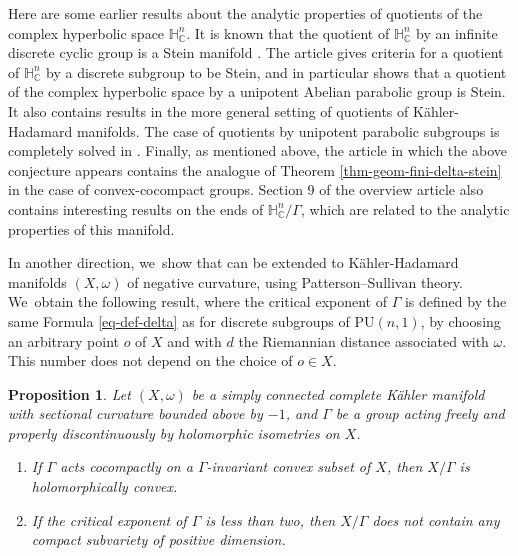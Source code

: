 \documentclass[11pt]{article}
\newtheorem{propositionIntro}[theoremIntro]{Proposition}
\theoremstyle{definition}
\newcommand{\C}{\mathbb{C}}
\newcommand{\HNC}{\mathbb{H}^{n}_{\C}}
\newcommand{\PU}{\mathrm{PU}}
\def\C{\mathbb{C}}
\newcommand{\HNC}{\mathbb{H}^{n}_{\C}}
\newcommand{\PU}{\mathrm{PU}}
\begin{document}
Here are some earlier results about the analytic properties of quotients of the complex hyperbolic space $\HNC$. It is known that the quotient of $\HNC$ by an infinite discrete cyclic group is a Stein manifold \cite{defabritiisFamilyComplexManifolds1998manuel,defabritiisQuotientsUnitBall2001manuel,miebachQuotientsBoundedHomogeneous2010}. The article \cite{chenDiscreteGroupsHolomorphic2013} gives criteria for a quotient of $\HNC$ by a discrete subgroup to be Stein, and in particular shows that a quotient of the complex hyperbolic space by a unipotent Abelian parabolic group is Stein. It also contains results in the more general setting of quotients of Kähler-Hadamard manifolds. The case of quotients by unipotent parabolic subgroups is completely solved in \cite{miebachQuotientsBoundedHomogeneous2024}. Finally, as mentioned above, the article \cite{deyNoteComplexhyperbolicKleinian2020} in which the above conjecture appears contains the analogue of Theorem \ref{thm-geom-fini-delta-stein} in the case of convex-cocompact groups. Section 9 of the overview article \cite{kapovichSurveyComplexHyperbolic2022} also contains interesting results on the ends of $\HNC/\Gamma$, which are related to the analytic properties of this manifold.

In another direction, we~show that \cite[Th.\,1]{deyNoteComplexhyperbolicKleinian2020} can be extended to Kähler-Hadamard manifolds $(X,\omega)$ of negative curvature, using Patterson--Sullivan theory. We~obtain the following result, where the critical exponent of $\Gamma$ is defined by the same Formula \eqref{eq-def-delta} as for discrete subgroups of $\PU(n,1)$, by choosing an arbitrary point $o$ of $X$ and with $d$ the Riemannian distance associated with $\omega$. This number does not depend on the choice of $o\in X$.

\begin{propositionIntro}\label{prop-KH-general}
Let $(X,\omega)$ be a simply connected complete Kähler manifold with sectional curvature bounded above by $-1$, and $\Gamma$ be a group acting freely and properly discontinuously by holomorphic isometries on $X$.
\begin{enumerate}
\item If $\Gamma$ acts cocompactly on a $\Gamma$\nobreakdash-invariant convex subset of $X$, then $X/\Gamma$ is holomorphically convex.
\item If the critical exponent of $\Gamma$ is less than two, then $X/\Gamma$ does not contain any compact subvariety of positive dimension.
\end{enumerate}
\end{propositionIntro}
\end{document}
